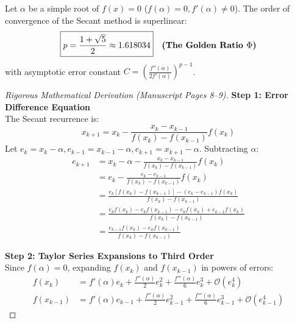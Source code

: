 \begin{theorembox}
Let $\alpha$ be a simple root of $f(x) = 0$ ($f(\alpha) = 0, f'(\alpha) \ne 0$). The order of convergence of the Secant method is superlinear:
\begin{equation}
    \boxed{p = \frac{1 + \sqrt{5}}{2} \approx 1.618034} \quad \text{\textbf{(The Golden Ratio $\Phi$)}}
\end{equation}
with asymptotic error constant $C = \left(\frac{f''(\alpha)}{2f'(\alpha)}\right)^{p-1}$.
\end{theorembox}

\begin{proof}[Rigorous Mathematical Derivation (Manuscript Pages 8--9)]
\noindent\textbf{Step 1: Error Difference Equation} \\
The Secant recurrence is:
\begin{equation}
    x_{k+1} = x_k - \frac{x_k - x_{k-1}}{f(x_k) - f(x_{k-1})} f(x_k)
\end{equation}
Let $e_k = x_k - \alpha, e_{k-1} = x_{k-1} - \alpha, e_{k+1} = x_{k+1} - \alpha$. Subtracting $\alpha$:
\begin{align}
    e_{k+1} &= x_k - \alpha - \frac{x_k - x_{k-1}}{f(x_k) - f(x_{k-1})} f(x_k) \nonumber \\
    &= e_k - \frac{e_k - e_{k-1}}{f(x_k) - f(x_{k-1})} f(x_k) \nonumber \\
    &= \frac{e_k[f(x_k) - f(x_{k-1})] - (e_k - e_{k-1}) f(x_k)}{f(x_k) - f(x_{k-1})} \nonumber \\
    &= \frac{e_k f(x_k) - e_k f(x_{k-1}) - e_k f(x_k) + e_{k-1} f(x_k)}{f(x_k) - f(x_{k-1})} \nonumber \\
    &= \frac{e_{k-1} f(x_k) - e_k f(x_{k-1})}{f(x_k) - f(x_{k-1})}
    \label{eq:secant_error_ratio_master}
\end{align}

\noindent\textbf{Step 2: Taylor Series Expansions to Third Order} \\
Since $f(\alpha) = 0$, expanding $f(x_k)$ and $f(x_{k-1})$ in powers of errors:
\begin{align}
    f(x_k) &= f'(\alpha) e_k + \frac{f''(\alpha)}{2} e_k^2 + \frac{f'''(\alpha)}{6} e_k^3 + \mathcal{O}(e_k^4) \\
    f(x_{k-1}) &= f'(\alpha) e_{k-1} + \frac{f''(\alpha)}{2} e_{k-1}^2 + \frac{f'''(\alpha)}{6} e_{k-1}^3 + \mathcal{O}(e_{k-1}^4)
\end{align}


\end{proof}
